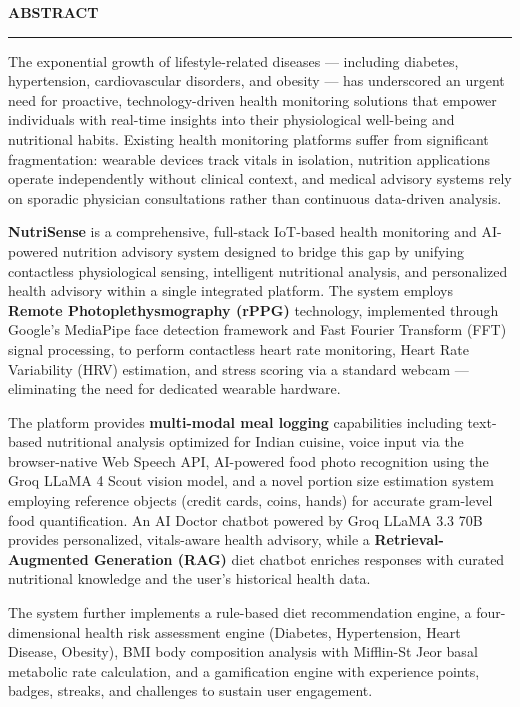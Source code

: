 \documentclass[12pt,a4paper]{report}
\begin{document}
\newpage
\thispagestyle{empty}
\begin{center}
{\LARGE\textbf{ABSTRACT}}\\[0.5cm]
\rule{\textwidth}{1pt}
\end{center}
\vspace{0.5cm}

The exponential growth of lifestyle-related diseases --- including diabetes, hypertension, cardiovascular disorders, and obesity --- has underscored an urgent need for proactive, technology-driven health monitoring solutions that empower individuals with real-time insights into their physiological well-being and nutritional habits. Existing health monitoring platforms suffer from significant fragmentation: wearable devices track vitals in isolation, nutrition applications operate independently without clinical context, and medical advisory systems rely on sporadic physician consultations rather than continuous data-driven analysis.

\textbf{NutriSense} is a comprehensive, full-stack IoT-based health monitoring and AI-powered nutrition advisory system designed to bridge this gap by unifying contactless physiological sensing, intelligent nutritional analysis, and personalized health advisory within a single integrated platform. The system employs \textbf{Remote Photoplethysmography (rPPG)} technology, implemented through Google's MediaPipe face detection framework and Fast Fourier Transform (FFT) signal processing, to perform contactless heart rate monitoring, Heart Rate Variability (HRV) estimation, and stress scoring via a standard webcam --- eliminating the need for dedicated wearable hardware.

The platform provides \textbf{multi-modal meal logging} capabilities including text-based nutritional analysis optimized for Indian cuisine, voice input via the browser-native Web Speech API, AI-powered food photo recognition using the Groq LLaMA 4 Scout vision model, and a novel portion size estimation system employing reference objects (credit cards, coins, hands) for accurate gram-level food quantification. An AI Doctor chatbot powered by Groq LLaMA 3.3 70B provides personalized, vitals-aware health advisory, while a \textbf{Retrieval-Augmented Generation (RAG)} diet chatbot enriches responses with curated nutritional knowledge and the user's historical health data.

The system further implements a rule-based diet recommendation engine, a four-dimensional health risk assessment engine (Diabetes, Hypertension, Heart Disease, Obesity), BMI body composition analysis with Mifflin-St Jeor basal metabolic rate calculation, and a gamification engine with experience points, badges, streaks, and challenges to sustain user engagement.
\end{document}
